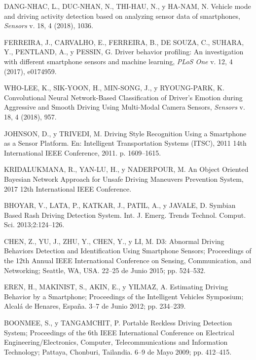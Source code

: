 
\begin{thebibliography}{50}
DANG-NHAC, L., DUC-NHAN, N., THI-HAU, N., y HA-NAM, N. Vehicle mode and driving activity detection based on analyzing sensor data of smartphones, \textit{Sensors} v. 18, 4 (2018), 1036.

FERREIRA, J., CARVALHO, E., FERREIRA, B., DE SOUZA, C., SUHARA, Y., PENTLAND, A., y PESSIN, G. Driver behavior profiling: An investigation with different smartphone sensors and machine learning, \textit{PLoS One} v. 12, 4 (2017), e0174959.

WHO-LEE, K., SIK-YOON, H., MIN-SONG, J., y RYOUNG-PARK, K. Convolutional Neural Network-Based Classification of Driver’s Emotion during Aggressive and Smooth Driving Using Multi-Modal Camera Sensors, \textit{Sensors} v. 18, 4 (2018), 957.

JOHNSON, D., y TRIVEDI, M. Driving Style Recognition Using a Smartphone as a Sensor Platform. En: Intelligent Transportation Systems (ITSC), 2011 14th International IEEE Conference, 2011. p. 1609–1615.

KRIDALUKMANA, R., YAN-LU, H., y NADERPOUR, M. An Object Oriented Bayesian Network Approach for Unsafe Driving Maneuvers Prevention System, 2017 12th International IEEE Conference.

BHOYAR, V., LATA, P., KATKAR, J., PATIL, A., y JAVALE, D. Symbian Based Rash Driving Detection System. Int. J. Emerg. Trends Technol. Comput. Sci. 2013;2:124–126.

CHEN, Z., YU, J., ZHU, Y., CHEN, Y., y LI, M. D3: Abnormal Driving Behaviors Detection and Identification Using Smartphone Sensors; Proceedings of the 12th Annual IEEE International Conference on Sensing, Communication, and Networking; Seattle, WA, USA. 22–25 de Junio 2015; pp. 524–532.

EREN, H., MAKINIST, S., AKIN, E., y YILMAZ, A. Estimating Driving Behavior by a Smartphone; Proceedings of the Intelligent Vehicles Symposium; Alcalá de Henares, Espa\~{n}a. 3–7 de Junio 2012; pp. 234–239.

BOONMEE, S., y TANGAMCHIT, P. Portable Reckless Driving Detection System; Proceedings of the 6th IEEE International Conference on Electrical Engineering/Electronics, Computer, Telecommunications and Information Technology; Pattaya, Chonburi, Tailandia. 6–9 de Mayo 2009; pp. 412–415.


\end{thebibliography}
